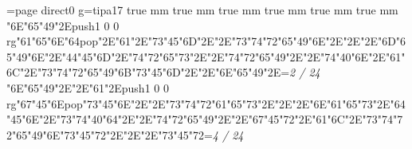 \chardef\match=\pdfcolorstackinit page direct{0 g}\nopagenumbers\font\ipa=tipa17 true mm true mm true mm true mm true mm true mm
\null\vfill\ipa\char"6E\ipa\char"65\ipa\char"49\ipa\char"2E\pdfcolorstack\match push{1 0 0 rg}\ipa\char"61\ipa\char"65\ipa\char"6E\ipa\char"64\pdfcolorstack\match pop{}\ipa\char"2E\ipa\char"61\ipa\char"2E\ipa\char"73\ipa\char"45\ipa\char"6D\bigskip\quad\quad\quad\ipa\char"2E\quad\quad\quad\ipa\char"2E\ipa\char"73\ipa\char"74\ipa\char"72\ipa\char"65\ipa\char"49\ipa\char"6E\bigskip\quad\quad\ipa\char"2E\quad\quad\quad\quad\ipa\char"2E\quad\ipa\char"2E\ipa\char"6D\ipa\char"65\ipa\char"49\ipa\char"6E\ipa\char"2E\ipa\char"44\ipa\char"45\ipa\char"6D\ipa\char"2E\ipa\char"74\ipa\char"72\ipa\char"65\ipa\char"73\ipa\char"2E\quad\quad\quad\bigskip\quad\ipa\char"2E\ipa\char"74\ipa\char"72\ipa\char"65\ipa\char"49\ipa\char"2E\quad\quad\ipa\char"2E\ipa\char"74\ipa\char"40\ipa\char"6E\ipa\char"2E\ipa\char"61\ipa\char"6C\ipa\char"2E\ipa\char"73\ipa\char"74\ipa\char"72\ipa\char"65\ipa\char"49\ipa\char"6B\bigskip\ipa\char"73\ipa\char"45\ipa\char"6D\ipa\char"2E\quad\quad\ipa\char"2E\ipa\char"6E\ipa\char"65\ipa\char"49\ipa\char"2E\quad\quad\quad\bigskip\vfill\footline={\hfill\tenrm\it 2 / 24}\eject
\null\vfill\ipa\char"6E\ipa\char"65\ipa\char"49\ipa\char"2E\quad\quad\quad\quad\ipa\char"2E\ipa\char"61\ipa\char"2E\pdfcolorstack\match push{1 0 0 rg}\ipa\char"67\ipa\char"45\ipa\char"6E\pdfcolorstack\match pop{}\bigskip\ipa\char"73\ipa\char"45\ipa\char"6E\ipa\char"2E\quad\quad\quad\ipa\char"2E\ipa\char"73\ipa\char"74\ipa\char"72\ipa\char"61\ipa\char"65\ipa\char"73\bigskip\quad\quad\ipa\char"2E\quad\quad\quad\quad\ipa\char"2E\quad\ipa\char"2E\ipa\char"6E\ipa\char"61\ipa\char"65\ipa\char"73\ipa\char"2E\ipa\char"64\ipa\char"45\ipa\char"6E\ipa\char"2E\ipa\char"73\ipa\char"74\ipa\char"40\ipa\char"64\ipa\char"2E\quad\quad\quad\bigskip\quad\ipa\char"2E\ipa\char"74\ipa\char"72\ipa\char"65\ipa\char"49\ipa\char"2E\quad\quad\ipa\char"2E\ipa\char"67\ipa\char"45\ipa\char"72\ipa\char"2E\ipa\char"61\ipa\char"6C\ipa\char"2E\ipa\char"73\ipa\char"74\ipa\char"72\ipa\char"65\ipa\char"49\ipa\char"6E\bigskip\ipa\char"73\ipa\char"45\ipa\char"72\ipa\char"2E\quad\quad\ipa\char"2E\quad\quad\quad\ipa\char"2E\ipa\char"73\ipa\char"45\ipa\char"72\bigskip\vfill\footline={\hfill\tenrm\it 4 / 24}\eject
